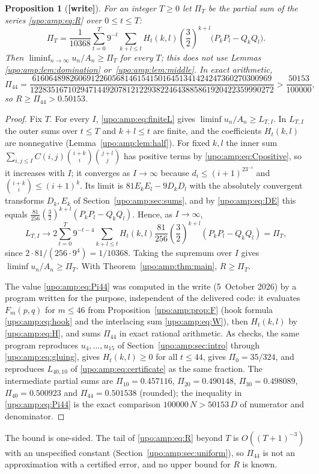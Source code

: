 \documentclass[11pt,letterpaper]{article}
\newtheorem{proposition}[theorem]{Proposition}
\theoremstyle{remark}\newtheorem{remark}[theorem]{Remark}
\numberwithin{equation}{section}
\newcommand{\wtag}{\textup{\textbf{[write]}}}
\begin{document}
\begin{proposition}[\wtag]\label{upo:amp:prop:sharper}
For an integer $T\ge0$ let $\Pi_T$ be the partial sum of the series \eqref{upo:amp:eq:R} over $0\le t\le T$:
\[
\Pi_T=\frac1{10368}\sum_{t=0}^{T}9^{-t}\sum_{k+l\le t}H_t(k,l)\left(\frac32\right)^{k+l}\bigl(P_kP_l-Q_kQ_l\bigr).
\]
Then $\liminf_{n\to\infty}u_n/A_n\ge\Pi_T$ for every $T$; this does not use Lemmas \ref{upo:amp:lem:domination} or~\ref{upo:amp:lem:middle}. In exact arithmetic,
\begin{equation}\label{upo:amp:eq:Pi44}
\Pi_{44}=\frac{616064898260691226056814615415016451341424247360270300969}{1228351671029471449207812122938224643885861920422359990272}>\frac{50153}{100000},
\end{equation}
so $R\ge\Pi_{44}>0.50153$.
\end{proposition}
\begin{proof}
Fix $T$. For every $I$, \eqref{upo:amp:eq:finiteL} gives $\liminf u_n/A_n\ge L_{T,I}$. In $L_{T,I}$ the outer sums over $t\le T$ and $k+l\le t$ are finite, and the coefficients $H_t(k,l)$ are nonnegative (Lemma~\ref{upo:amp:lem:half}). For fixed $k,l$ the inner sum $\sum_{i,j\le I}C(i,j)\binom{i+k}i\binom{j+l}j$ has positive terms by \eqref{upo:amp:eq:Cpositive}, so it increases with $I$; it converges as $I\to\infty$ because $d_i\le(i+1)^23^{-i}$ and $\binom{i+k}i\le(i+1)^k$. Its limit is $81E_kE_l-9D_kD_l$ with the absolutely convergent transforms $D_k,E_k$ of Section~\ref{upo:amp:sec:sums}, and by \eqref{upo:amp:eq:DE} this equals $\frac{81}{256}(\frac32)^{k+l}(P_kP_l-Q_kQ_l)$. Hence, as $I\to\infty$,
\[
L_{T,I}\longrightarrow2\sum_{t=0}^T9^{-t-4}\sum_{k+l\le t}H_t(k,l)\frac{81}{256}\left(\frac32\right)^{k+l}(P_kP_l-Q_kQ_l)=\Pi_T,
\]
since $2\cdot81/(256\cdot9^4)=1/10368$. Taking the supremum over $I$ gives $\liminf u_n/A_n\ge\Pi_T$. With Theorem~\ref{upo:amp:thm:main}, $R\ge\Pi_T$.

The value \eqref{upo:amp:eq:Pi44} was computed in the write (5~October 2026) by a program written for the purpose, independent of the delivered code: it evaluates $F_m(p,q)$ for $m\le46$ from Proposition~\ref{upo:amp:prop:F} (hook formula \eqref{upo:amp:eq:hook} and the interlacing sum \eqref{upo:amp:eq:W}), then $H_t(k,l)$ by \eqref{upo:amp:eq:H}, and sums $\Pi_{44}$ in exact rational arithmetic. As checks, the same program reproduces $u_4,\ldots,u_{15}$ of Section~\ref{upo:amp:sec:intro} through \eqref{upo:amp:eq:gluing}, gives $H_t(k,l)\ge0$ for all $t\le44$, gives $\Pi_0=35/324$, and reproduces $L_{40,10}$ of \eqref{upo:amp:eq:certificate} as the same fraction. The intermediate partial sums are $\Pi_{10}=0.457116$, $\Pi_{20}=0.490148$, $\Pi_{30}=0.498089$, $\Pi_{40}=0.500923$ and $\Pi_{44}=0.501538$ (rounded); the inequality in \eqref{upo:amp:eq:Pi44} is the exact comparison $100000\,N>50153\,D$ of numerator and denominator.
\end{proof}
The bound is one-sided. The tail of \eqref{upo:amp:eq:R} beyond $T$ is $O((T+1)^{-3})$ with an unspecified constant (Section~\ref{upo:amp:sec:uniform}), so $\Pi_{44}$ is not an approximation with a certified error, and no upper bound for $R$ is known.
\end{document}
